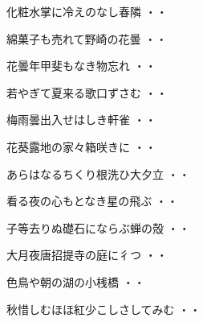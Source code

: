 \begin{shiika}化粧水掌に冷えのなし春隣
\hfill{・・}\end{shiika}
\vspace{0.6cm}
\begin{shiika}綿菓子も売れて野崎の花曇
\hfill{・・}\end{shiika}
\vspace{0.6cm}
\begin{shiika}花曇年甲斐もなき物忘れ
\hfill{・・}\end{shiika}
\vspace{0.6cm}
\begin{shiika}若やぎて夏来る歌口ずさむ
\hfill{・・}\end{shiika}
\vspace{0.6cm}
\begin{shiika}梅雨曇出入せはしき軒雀
\hfill{・・}\end{shiika}
\vspace{0.6cm}
\begin{shiika}花葵露地の家々箱咲きに
\hfill{・・}\end{shiika}
\vspace{0.6cm}
\begin{shiika}あらはなるちくり根洗ひ大夕立
\hfill{・・}\end{shiika}
\vspace{0.6cm}
\begin{shiika}看る夜の心もとなき星の飛ぶ
\hfill{・・}\end{shiika}
\vspace{0.6cm}
\begin{shiika}子等去りぬ礎石にならぶ蝉の殻
\hfill{・・}\end{shiika}
\vspace{0.6cm}
\begin{shiika}大月夜唐招提寺の庭に彳つ
\hfill{・・}\end{shiika}
\vspace{0.6cm}
\begin{shiika}色鳥や朝の湖の小桟橋
\hfill{・・}\end{shiika}
\vspace{0.6cm}
\begin{shiika}秋惜しむほほ紅少こしさしてみむ
\hfill{・・}\end{shiika}
